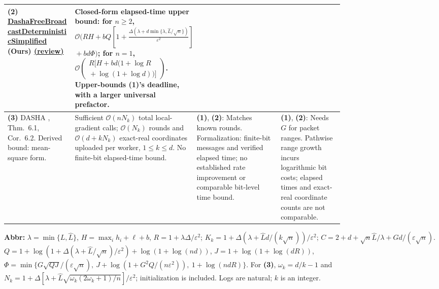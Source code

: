 \begin{table}[tp]
\begin{threeparttable}
\begin{tabularx}{\linewidth}{@{}>{\raggedright\arraybackslash}p{0.20\linewidth}>{\raggedright\arraybackslash}p{0.32\linewidth}>{\raggedright\arraybackslash}p{0.25\linewidth}>{\raggedright\arraybackslash}X@{}}
\midrule
\textbf{(2)} \href{https://github.com/k3nfalt/longtails/blob/main/LongTails/Theorems/DashaFreeBroadcastDeterministicSimplified.lean}{Dasha\allowbreak Free\allowbreak Broadcast\allowbreak Deterministic\allowbreak Simplified} \textbf{(Ours)} \href{https://github.com/k3nfalt/longtails/blob/main/scripts/reviews/DashaFreeBroadcastDeterministicSimplified.md}{(review)}
& Closed-form elapsed-time upper bound:
for $n\ge2$,
$\displaystyle\mathcal{O}\!\bigl(RH+bQ\!\left[1+\frac{\Delta(\lambda+d\min\{\lambda,\widehat L/\sqrt n\})}{\varepsilon^2}\right]$\newline
$\displaystyle{}+bd\Phi\bigr)$;
for $n=1$,
$\displaystyle\mathcal{O}\!\left(\begin{gathered}R[H+bd(1+\log R\\{}+\log(1+\log d))]\end{gathered}\right)$.
Upper-bounds \textbf{(1)}'s deadline, with a larger universal prefactor.
& & \\
\midrule[1.2pt]
\textbf{(3)} DASHA \citep{dfbTyurinRichtarik2022v2}, Thm.~6.1, Cor.~6.2. Derived bound: mean-square form.
& Sufficient $\mathcal{O}(nN_k)$ total local-gradient calls; $\mathcal{O}(N_k)$ rounds and $\mathcal{O}(d+kN_k)$ exact-real coordinates uploaded per worker, $1\le k\le d$. No finite-bit elapsed-time bound.
& \textbf{(1)}, \textbf{(2)}: Matches known rounds. Formalization: finite-bit messages and verified elapsed time; no established rate improvement or comparable bit-level time bound.
& \textbf{(1)}, \textbf{(2)}: Needs $G$ for packet ranges. Pathwise range growth incurs logarithmic bit costs; elapsed times and exact-real coordinate counts are not comparable. \\
\bottomrule
\end{tabularx}
\begin{tablenotes}[flushleft]\footnotesize
\item[] \textbf{Abbr:} $\lambda=\min\{L,\widehat L\}$, $H=\max_i h_i+\ell+b$, $R=1+\lambda\Delta/\varepsilon^2$;
$K_k=1+\Delta(\lambda+\widehat Ld/(k\sqrt n))/\varepsilon^2$;
$C=2+d+\sqrt n\widehat L/\lambda+Gd/(\varepsilon\sqrt n)$.
$Q=1+\log(1+\Delta(\lambda+\widehat L/\sqrt n)/\varepsilon^2)+\log(1+\log(nd))$,
$J=1+\log(1+\log(dR))$,
$\Phi=\min\{G\sqrt{QJ}/(\varepsilon\sqrt n),\ J+\log(1+G^2Q/(n\varepsilon^2)),\ 1+\log(ndR)\}$.
For \textbf{(3)}, $\omega_k=d/k-1$ and
$N_k=1+\Delta[\lambda+\widehat L\sqrt{\omega_k(2\omega_k+1)/n}]/\varepsilon^2$; initialization is included. Logs are natural; $k$ is an integer.
\end{tablenotes}
\end{threeparttable}
\end{table}
\clearpage
